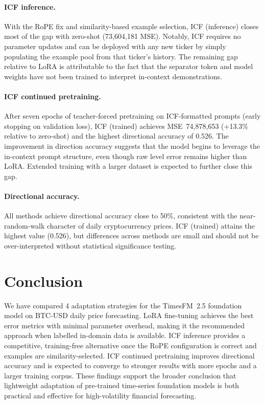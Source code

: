 \documentclass[11pt,a4paper]{article}
\begin{document}
\paragraph{ICF inference.}
With the RoPE fix and similarity-based example selection, ICF (inference) closes most of the gap with zero-shot (73,604,181 MSE). Notably, ICF requires no parameter updates and can be deployed with any new ticker by simply populating the example pool from that ticker's history. The remaining gap relative to LoRA is attributable to the fact that the separator token and model weights have not been trained to interpret in-context demonstrations.

\paragraph{ICF continued pretraining.}
After seven epochs of teacher-forced pretraining on ICF-formatted prompts (early stopping on validation loss), ICF (trained) achieves MSE~74,878,653 (+13.3\% relative to zero-shot) and the highest directional accuracy of 0.526. The improvement in direction accuracy suggests that the model begins to leverage the in-context prompt structure, even though raw level error remains higher than LoRA. Extended training with a larger dataset is expected to further close this gap.

\paragraph{Directional accuracy.}
All methods achieve directional accuracy close to 50\%, consistent with the near-random-walk character of daily cryptocurrency prices. ICF (trained) attains the highest value (0.526), but differences across methods are small and should not be over-interpreted without statistical significance testing.

\section{Conclusion}

We have compared 4 adaptation strategies for the TimesFM~2.5 foundation model on BTC-USD daily price forecasting. LoRA fine-tuning achieves the best error metrics with minimal parameter overhead, making it the recommended approach when labelled in-domain data is available. ICF inference provides a competitive, training-free alternative once the RoPE configuration is correct and examples are similarity-selected. ICF continued pretraining improves directional accuracy and is expected to converge to stronger results with more epochs and a larger training corpus. These findings support the broader conclusion that lightweight adaptation of pre-trained time-series foundation models is both practical and effective for high-volatility financial forecasting.
\end{document}
